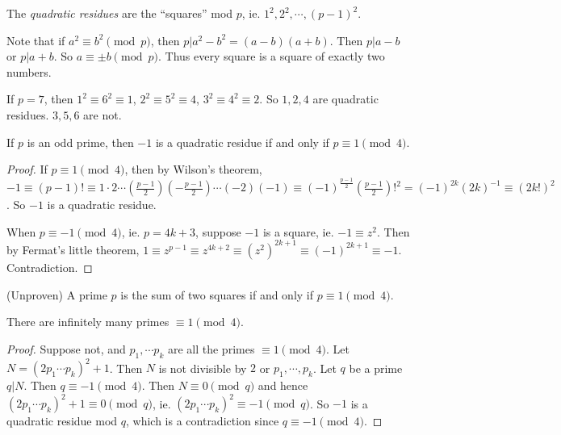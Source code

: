 \documentclass[a4paper]{article}
\begin{document}
\begin{defi}
  The \emph{quadratic residues} are the ``squares'' mod $p$, ie. $1^2, 2^2, \cdots, (p - 1)^2$.
\end{defi}

Note that if $a^2 \equiv b^2\pmod p$, then $p | a^2 - b^2 = (a - b)(a + b)$. Then $p | a - b$ or $p | a + b$. So $a\equiv \pm b\pmod p$. Thus every square is a square of exactly two numbers.

\begin{eg}
  If $p = 7$, then $1^2 \equiv 6^2 \equiv 1$, $2^2 \equiv 5^2 \equiv 4$, $3^2 \equiv 4^2 \equiv 2$. So $1, 2, 4$ are quadratic residues. $3, 5, 6$ are not.
\end{eg}

\begin{prop}
  If $p$ is an odd prime, then $-1$ is a quadratic residue if and only if $p\equiv 1\pmod 4$.
\end{prop}

\begin{proof}
  If $p \equiv 1 \pmod 4$, then by Wilson's theorem, $-1 \equiv (p - 1)!\equiv 1\cdot 2\cdots \left(\frac{p - 1}{2}\right)\left(-\frac{p - 1}{2}\right)\cdots (-2)(-1)\equiv (-1)^{\frac{p - 1}{2}}\left(\frac{p - 1}{2}\right)!^2 = (-1)^{2k}(2k)^{-1} \equiv (2k!)^2$. So $-1$ is a quadratic residue.

  When $p \equiv -1\pmod 4$, ie. $p = 4k + 3$, suppose $-1$ is a square, ie. $-1 \equiv z^2$. Then by Fermat's little theorem, $1\equiv z^{p - 1} \equiv z^{4k+ 2}\equiv (z^2)^{2k + 1} \equiv (-1)^{2k + 1}\equiv -1$. Contradiction.
\end{proof}
\begin{prop}
  (Unproven) A prime $p$ is the sum of two squares if and only if $p\equiv 1\pmod 4$.
\end{prop}

\begin{prop}
  There are infinitely many primes $\equiv 1\pmod 4$.
\end{prop}

\begin{proof}
  Suppose not, and $p_1, \cdots p_k$ are all the primes $\equiv 1\pmod 4$. Let $N = (2p_1\cdots p_k)^2 + 1$. Then $N$ is not divisible by $2$ or $p_1,\cdots, p_k$. Let $q$ be a prime $q | N$. Then $q \equiv -1\pmod 4$. Then $N \equiv 0\pmod q$ and hence $(2p_1\cdots p_k)^2 + 1\equiv 0\pmod q$, ie. $(2p_1\cdots p_k)^2 \equiv -1\pmod q$. So $-1$ is a quadratic residue mod $q$, which is a contradiction since $q \equiv -1\pmod 4$.
\end{proof}
\end{document}
